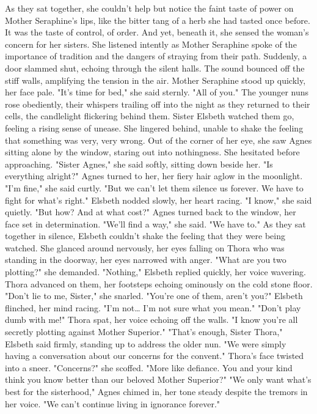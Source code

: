 \documentclass[11pt]{article}
\begin{document}
As they sat together, she couldn't help but notice the faint taste of power on Mother Seraphine's lips, like the bitter tang of a herb she had tasted once before. It was the taste of control, of order. And yet, beneath it, she sensed the woman's concern for her sisters. She listened intently as Mother Seraphine spoke of the importance of tradition and the dangers of straying from their path.
Suddenly, a door slammed shut, echoing through the silent halls. The sound bounced off the stiff walls, amplifying the tension in the air. Mother Seraphine stood up quickly, her face pale. "It's time for bed," she said sternly. "All of you."
The younger nuns rose obediently, their whispers trailing off into the night as they returned to their cells, the candlelight flickering behind them. Sister Elsbeth watched them go, feeling a rising sense of unease. She lingered behind, unable to shake the feeling that something was very, very wrong.
Out of the corner of her eye, she saw Agnes sitting alone by the window, staring out into nothingness. She hesitated before approaching. "Sister Agnes," she said softly, sitting down beside her. "Is everything alright?"
Agnes turned to her, her fiery hair aglow in the moonlight. "I'm fine," she said curtly. "But we can't let them silence us forever. We have to fight for what's right."
Elsbeth nodded slowly, her heart racing. "I know," she said quietly. "But how? And at what cost?"
Agnes turned back to the window, her face set in determination. "We'll find a way," she said. "We have to."
As they sat together in silence, Elsbeth couldn't shake the feeling that they were being watched. She glanced around nervously, her eyes falling on Thora who was standing in the doorway, her eyes narrowed with anger. "What are you two plotting?" she demanded.
"Nothing," Elsbeth replied quickly, her voice wavering.
Thora advanced on them, her footsteps echoing ominously on the cold stone floor. "Don't lie to me, Sister," she snarled. "You're one of them, aren't you?"
Elsbeth flinched, her mind racing. "I'm not\ldots{} I'm not sure what you mean."
"Don't play dumb with me!" Thora spat, her voice echoing off the walls. "I know you're all secretly plotting against Mother Superior."
"That's enough, Sister Thora," Elsbeth said firmly, standing up to address the older nun. "We were simply having a conversation about our concerns for the convent."
Thora's face twisted into a sneer. "Concerns?" she scoffed. "More like defiance. You and your kind think you know better than our beloved Mother Superior?"
"We only want what's best for the sisterhood," Agnes chimed in, her tone steady despite the tremors in her voice. "We can't continue living in ignorance forever."
\end{document}
